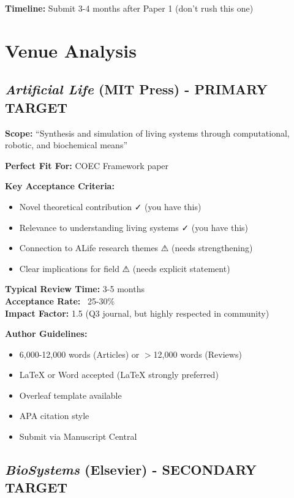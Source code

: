 \documentclass[11pt]{article}
\begin{document}
\textbf{Timeline:} Submit 3-4 months after Paper 1 (don't rush this one)

\section{Venue Analysis}

\subsection{\textit{Artificial Life} (MIT Press) - PRIMARY TARGET}

\textbf{Scope:} ``Synthesis and simulation of living systems through computational, robotic, and biochemical means''

\textbf{Perfect Fit For:} COEC Framework paper

\textbf{Key Acceptance Criteria:}
\begin{itemize}[leftmargin=*]
    \item Novel theoretical contribution ✓ (you have this)
    \item Relevance to understanding living systems ✓ (you have this)
    \item Connection to ALife research themes ⚠ (needs strengthening)
    \item Clear implications for field ⚠ (needs explicit statement)
\end{itemize}

\textbf{Typical Review Time:} 3-5 months\\
\textbf{Acceptance Rate:} ~25-30\%\\
\textbf{Impact Factor:} 1.5 (Q3 journal, but highly respected in community)

\textbf{Author Guidelines:}
\begin{itemize}[leftmargin=*]
    \item 6,000-12,000 words (Articles) or $>$12,000 words (Reviews)
    \item LaTeX or Word accepted (LaTeX strongly preferred)
    \item Overleaf template available
    \item APA citation style
    \item Submit via Manuscript Central
\end{itemize}

\subsection{\textit{BioSystems} (Elsevier) - SECONDARY TARGET}
\end{document}
